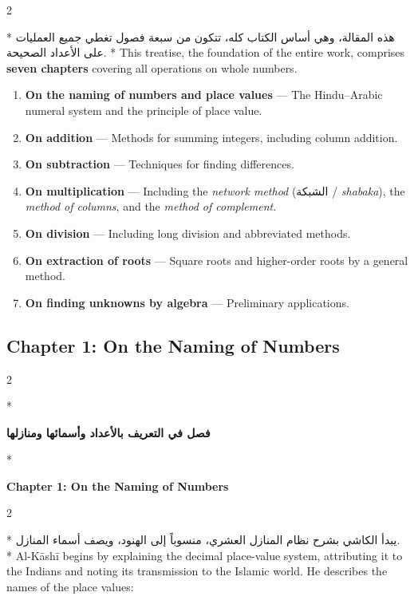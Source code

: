 \documentclass[11pt,a4paper]{article}
\newcommand{\ar}[1]{\arabicfont\beginR #1\endR}
\newenvironment{bilingual}{%
  \vspace{0.3em}%
  \begin{paracol}{2}%
}{%
  \end{paracol}%
  \vspace{0.3em}%
}
\begin{document}
\begin{bilingual}
\switchcolumn[0]*
\ar{هذه المقالة، وهي أساس الكتاب كله، تتكون من سبعة فصول تغطي جميع العمليات على الأعداد الصحيحة.}
\switchcolumn[1]*
This treatise, the foundation of the entire work, comprises
\textbf{seven chapters} covering all operations on whole numbers.
\end{bilingual}

\begin{enumerate}[label=\textbf{Ch.\arabic*:}]
  \item \textbf{On the naming of numbers and place values} --- The
  Hindu--Arabic numeral system and the principle of place value.
  \item \textbf{On addition} --- Methods for summing integers, including
  column addition.
  \item \textbf{On subtraction} --- Techniques for finding differences.
  \item \textbf{On multiplication} --- Including the \textit{network
  method} (\ar{الشبكة} / \textit{shabaka}), the \textit{method of
  columns}, and the \textit{method of complement}.
  \item \textbf{On division} --- Including long division and abbreviated
  methods.
  \item \textbf{On extraction of roots} --- Square roots and higher-order
  roots by a general method.
  \item \textbf{On finding unknowns by algebra} --- Preliminary
  applications.
\end{enumerate}

\subsection{Chapter 1: On the Naming of Numbers}

\begin{bilingual}
\switchcolumn[0]*
\begin{center}
\textbf{\color{chapcolor}\ar{فصل في التعريف بالأعداد وأسمائها ومنازلها}}
\end{center}
\switchcolumn[1]*
\begin{center}
\textbf{\color{chapcolor}Chapter 1: On the Naming of Numbers}
\end{center}
\end{bilingual}

\begin{bilingual}
\switchcolumn[0]*
\ar{يبدأ الكاشي بشرح نظام المنازل العشري، منسوباً إلى الهنود، ويصف أسماء المنازل.}
\switchcolumn[1]*
Al-K\=ash\=i begins by explaining the decimal place-value system, attributing
it to the Indians and noting its transmission to the Islamic world. He
describes the names of the place values:
\end{bilingual}
\end{document}
